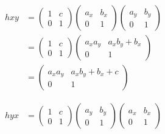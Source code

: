 \documentclass[12pt,letterpaper]{algebra_book}
\theoremstyle{definition}
\begin{document}
\begin{description}
    \begin{minipage}{0.40\textwidth}
        \begin{align*}
            hxy &= 
            \begin{pmatrix}
                1 & c \\
                0 & 1    
            \end{pmatrix}
            \begin{pmatrix}
                a_x & b_x \\
                0 & 1    
            \end{pmatrix}
            \begin{pmatrix}
                a_y & b_y \\
                0 & 1    
            \end{pmatrix}\\
            &= 
            \begin{pmatrix}
                1 & c \\
                0 & 1    
            \end{pmatrix}
            \begin{pmatrix}
                a_xa_y & a_xb_y + b_x \\
                0 & 1    
            \end{pmatrix}\\
            &= 
            \begin{pmatrix}
                a_xa_y & a_xb_y + b_x + c \\
                0 & 1    
            \end{pmatrix}
        \end{align*}
    \end{minipage}
    \hfill
    \begin{minipage}{0.5\textwidth}
        \begin{align*}
            hyx &= 
            \begin{pmatrix}
                1 & c \\
                0 & 1    
            \end{pmatrix}
            \begin{pmatrix}
                a_y & b_y \\
                0 & 1    
            \end{pmatrix}
            \begin{pmatrix}
                a_x & b_x \\
                0 & 1    
            \end{pmatrix}\\

\end{align*}
\end{minipage}
\end{description}
\end{document}
